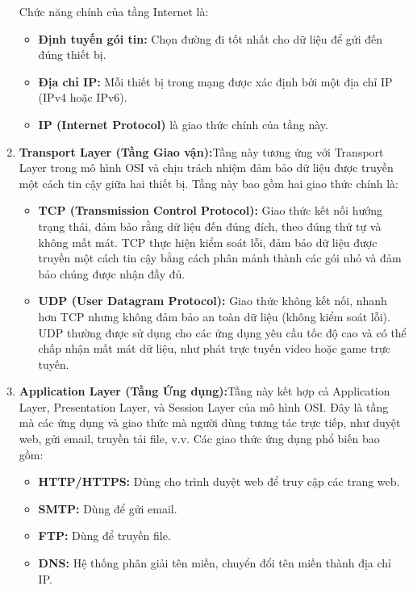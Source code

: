 \documentclass[a4paper,12pt]{article}
\begin{document}
\begin{enumerate}
Chức năng chính của tầng Internet là:
\begin{itemize}
    \item \textbf{Định tuyến gói tin: }Chọn đường đi tốt nhất cho dữ liệu để gửi đến đúng thiết bị.
    \item \textbf{Địa chỉ IP:} Mỗi thiết bị trong mạng được xác định bởi một địa chỉ IP (IPv4 hoặc IPv6).
    \item \textbf{IP (Internet Protocol)} là giao thức chính của tầng này.
\end{itemize}
    \item \textbf{ Transport Layer (Tầng Giao vận):}Tầng này tương ứng với Transport Layer trong mô hình OSI và chịu trách nhiệm đảm bảo dữ liệu được truyền một cách tin cậy giữa hai thiết bị. Tầng này bao gồm hai giao thức chính là:
    \begin{itemize}
        \item \textbf{TCP (Transmission Control Protocol): }Giao thức kết nối hướng trạng thái, đảm bảo rằng dữ liệu đến đúng đích, theo đúng thứ tự và không mất mát. TCP thực hiện kiểm soát lỗi, đảm bảo dữ liệu được truyền một cách tin cậy bằng cách phân mảnh thành các gói nhỏ và đảm bảo chúng được nhận đầy đủ.
        \item \textbf{UDP (User Datagram Protocol): }Giao thức không kết nối, nhanh hơn TCP nhưng không đảm bảo an toàn dữ liệu (không kiểm soát lỗi). UDP thường được sử dụng cho các ứng dụng yêu cầu tốc độ cao và có thể chấp nhận mất mát dữ liệu, như phát trực tuyến video hoặc game trực tuyến.
    \end{itemize}
    \item \textbf{Application Layer (Tầng Ứng dụng):}Tầng này kết hợp cả Application Layer, Presentation Layer, và Session Layer của mô hình OSI. Đây là tầng mà các ứng dụng và giao thức mà người dùng tương tác trực tiếp, như duyệt web, gửi email, truyền tải file, v.v. Các giao thức ứng dụng phổ biến bao gồm:
    \begin{itemize}
        \item \textbf{HTTP/HTTPS:} Dùng cho trình duyệt web để truy cập các trang web.
        \item \textbf{SMTP: }Dùng để gửi email.
        \item \textbf{FTP:} Dùng để truyền file.

        \item \textbf{DNS: }Hệ thống phân giải tên miền, chuyển đổi tên miền thành địa chỉ IP.
    \end{itemize}
\end{enumerate}
\end{document}
